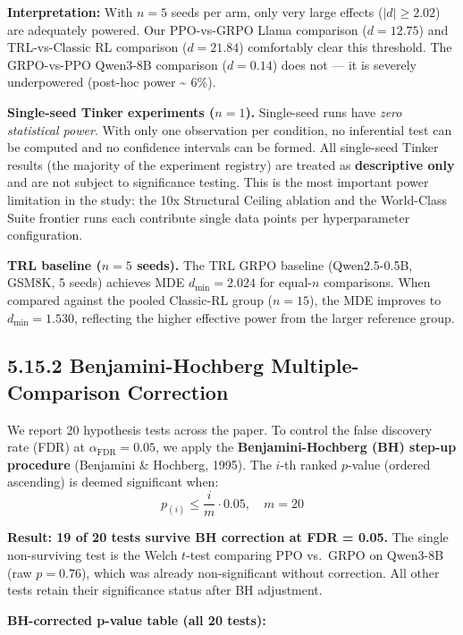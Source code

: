 \documentclass[
  american,
  11pt,
  a4paper,
  oneside]{report}
\begin{document}
\textbf{Interpretation:} With \(n = 5\) seeds per arm, only very large
effects (\(|d| \geq 2.02\)) are adequately powered. Our PPO-vs-GRPO
Llama comparison (\(d = 12.75\)) and TRL-vs-Classic RL comparison
(\(d = 21.84\)) comfortably clear this threshold. The GRPO-vs-PPO
Qwen3-8B comparison (\(d = 0.14\)) does not --- it is severely
underpowered (post-hoc power \textasciitilde{} 6\%).

\textbf{Single-seed Tinker experiments (\(n = 1\)).} Single-seed runs
have \emph{zero statistical power}. With only one observation per
condition, no inferential test can be computed and no confidence
intervals can be formed. All single-seed Tinker results (the majority of
the experiment registry) are treated as \textbf{descriptive only} and
are not subject to significance testing. This is the most important
power limitation in the study: the 10x Structural Ceiling ablation and
the World-Class Suite frontier runs each contribute single data points
per hyperparameter configuration.

\textbf{TRL baseline (\(n = 5\) seeds).} The TRL GRPO baseline
(Qwen2.5-0.5B, GSM8K, 5 seeds) achieves MDE \(d_{\min} = 2.024\) for
equal-\(n\) comparisons. When compared against the pooled Classic-RL
group (\(n = 15\)), the MDE improves to \(d_{\min} = 1.530\), reflecting
the higher effective power from the larger reference group.

\subsection{5.15.2 Benjamini-Hochberg Multiple-Comparison
Correction}\label{benjamini-hochberg-multiple-comparison-correction}

We report 20 hypothesis tests across the paper. To control the false
discovery rate (FDR) at \(\alpha_{\text{FDR}} = 0.05\), we apply the
\textbf{Benjamini-Hochberg (BH) step-up procedure} (Benjamini \&
Hochberg, 1995). The \(i\)-th ranked \(p\)-value (ordered ascending) is
deemed significant when:
\[p_{(i)} \le \frac{i}{m} \cdot 0.05, \quad m = 20
\]

\textbf{Result: 19 of 20 tests survive BH correction at FDR = 0.05.} The
single non-surviving test is the Welch \(t\)-test comparing PPO vs.~GRPO
on Qwen3-8B (raw \(p = 0.76\)), which was already non-significant
without correction. All other tests retain their significance status
after BH adjustment.

\textbf{BH-corrected p-value table (all 20 tests):}
\end{document}
